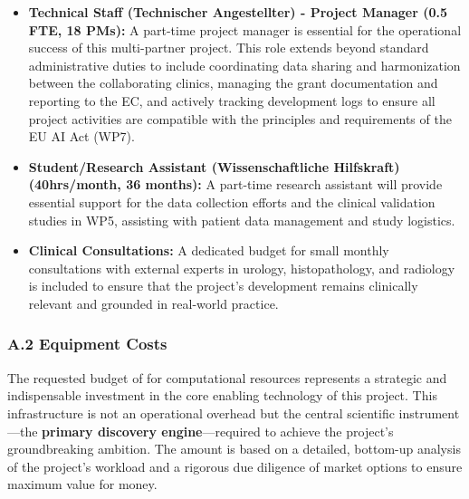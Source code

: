 \begin{itemize}
    \item \textbf{Technical Staff (Technischer Angestellter) - Project Manager (0.5 FTE, 18 PMs):} A part-time project manager is essential for the operational success of this multi-partner project. This role extends beyond standard administrative duties to include coordinating data sharing and harmonization between the collaborating clinics, managing the grant documentation and reporting to the EC, and actively tracking development logs to ensure all project activities are compatible with the principles and requirements of the EU AI Act (WP7).
    \item \textbf{Student/Research Assistant (Wissenschaftliche Hilfskraft) (40hrs/month, 36 months):} A part-time research assistant will provide essential support for the data collection efforts and the clinical validation studies in WP5, assisting with patient data management and study logistics.
    \item \textbf{Clinical Consultations:} A dedicated budget for small monthly consultations with external experts in urology, histopathology, and radiology is included to ensure that the project's development remains clinically relevant and grounded in real-world practice.
\end{itemize}

\subsubsection*{A.2 Equipment Costs}
The requested budget of  for computational resources represents a strategic and indispensable investment in the core enabling technology of this project. This infrastructure is not an operational overhead but the central scientific instrument—the \textbf{primary discovery engine}—required to achieve the project's groundbreaking ambition. The amount is based on a detailed, bottom-up analysis of the project's workload and a rigorous due diligence of market options to ensure maximum value for money.

